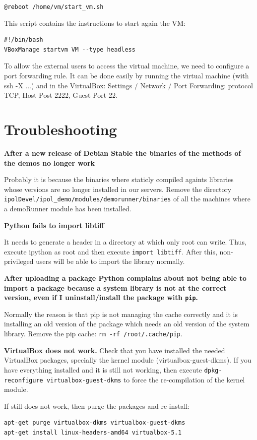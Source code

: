 \documentclass[a4paper,12pt]{article}
\begin{document}
{\tt @reboot /home/vm/start\_vm.sh}

This script contains the instructions to start again the VM:

\begin{verbatim}
#!/bin/bash
VBoxManage startvm VM --type headless
\end{verbatim}

To allow the external users to access the virtual machine, we need to configure a port forwarding rule.
It can be done easily by running the virtual machine (with ssh -X ...) and in the VirtualBox: Settings / Network / Port Forwarding: protocol TCP, Host Post 2222, Guest Port 22.

\section{Troubleshooting}

\textbf{After a new release of Debian Stable the binaries of the methods of the demos no longer work}

Probably it is because the binaries where staticly compiled againts libraries whose versions are no longer installed in our servers. Remove the directory {\tt ipolDevel/ipol\_demo/modules/demorunner/binaries} of all the machines where a demoRunner module has been installed.
\vspace{0.5cm}


\textbf{Python fails to import libtiff}

It needs to generate a header in a directory at which only root can write. Thus, execute ipython as root and then execute {\tt import libtiff}. After this, non-privileged users will be able to import the library normally.
\vspace{0.5cm}

\textbf{After uploading a package Python complains about not being able to import a package because a system library is not at the correct version, even if I uninstall/install the package with {\tt pip}.}

Normally the reason is that pip is not managing the cache correctly and it is installing an old version of the package which needs an old version of the system library. Remove the pip cache: {\tt rm -rf /root/.cache/pip}.
\vspace{0.5cm}

\textbf{VirtualBox does not work.}
Check that you have installed the needed VirtualBox packages, specially the kernel module (virtualbox-guest-dkms).
If you have everything installed and it is still not working, then execute {\tt dpkg-reconfigure virtualbox-guest-dkms} to force the re-compilation of the kernel module.

If still does not work, then purge the packages and re-install:

\begin{verbatim}
apt-get purge virtualbox-dkms virtualbox-guest-dkms
apt-get install linux-headers-amd64 virtualbox-5.1
\end{verbatim}




\end{document}
